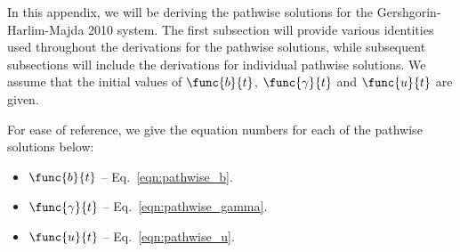 In this appendix, we will be deriving the pathwise solutions for the Gershgorin-Harlim-Majda 2010 system. The first subsection will provide various identities used throughout the derivations for the pathwise solutions, while subsequent subsections will include the derivations for individual pathwise solutions. We assume that the initial values of $\func{b}{t}$, $\func{\gamma}{t}$ and $\func{u}{t}$ are given.

For ease of reference, we give the equation numbers for each of the pathwise solutions below:

\begin{itemize}
	\item [] $\func{b}{t}$ -- Eq.~\ref{eqn:pathwise_b}.
	\item [] $\func{\gamma}{t}$ -- Eq.~\ref{eqn:pathwise_gamma}.
	\item [] $\func{u}{t}$ -- Eq.~\ref{eqn:pathwise_u}.
\end{itemize}